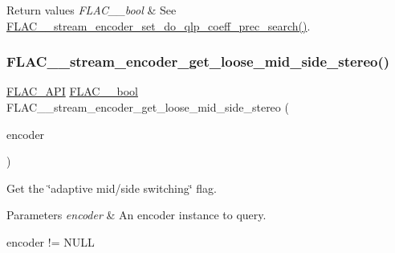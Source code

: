 \begin{DoxyRetVals}{Return values}
{\em F\+L\+A\+C\+\_\+\+\_\+bool} & See \hyperlink{group__flac__stream__encoder_ga3aa94a1aec1cf40c37e54434c86bb50d}{F\+L\+A\+C\+\_\+\+\_\+stream\+\_\+encoder\+\_\+set\+\_\+do\+\_\+qlp\+\_\+coeff\+\_\+prec\+\_\+search()}. \\
\hline
\end{DoxyRetVals}
\mbox{\label{group__flac__stream__encoder_ga539ac36925671ac84371a745f8acce17}} 
\subsubsection{\texorpdfstring{F\+L\+A\+C\+\_\+\+\_\+stream\+\_\+encoder\+\_\+get\+\_\+loose\+\_\+mid\+\_\+side\+\_\+stereo()}{FLAC\_\_stream\_encoder\_get\_loose\_mid\_side\_stereo()}}
{\footnotesize\ttfamily \hyperlink{group__flac__export_ga56ca07df8a23310707732b1c0007d6f5}{F\+L\+A\+C\+\_\+\+A\+PI} \hyperlink{ordinals_8h_a95103469f1cbd78b8cf250194985b34e}{F\+L\+A\+C\+\_\+\+\_\+bool} F\+L\+A\+C\+\_\+\+\_\+stream\+\_\+encoder\+\_\+get\+\_\+loose\+\_\+mid\+\_\+side\+\_\+stereo (\begin{DoxyParamCaption}\item[{\hyperlink{zconf_8h_a2c212835823e3c54a8ab6d95c652660e}{const} \hyperlink{struct_f_l_a_c_____stream_encoder}{F\+L\+A\+C\+\_\+\+\_\+\+Stream\+Encoder} $\ast$}]{encoder }\end{DoxyParamCaption})}

Get the \char`\"{}adaptive mid/side switching\char`\"{} flag.


\begin{DoxyParams}{Parameters}
{\em encoder} & An encoder instance to query.  
\begin{DoxyCode}
encoder != NULL 
\end{DoxyCode}
 \\
\hline
\end{DoxyParams}


